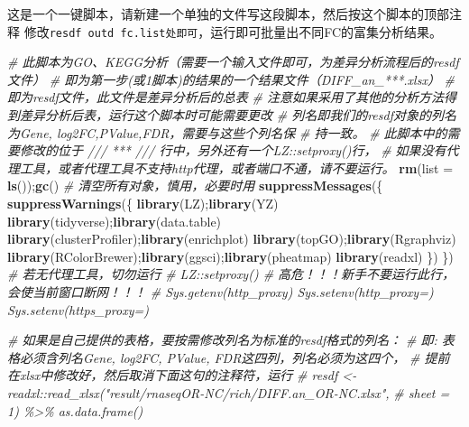 \documentclass[
]{book}
\newenvironment{Shaded}{\begin{snugshade}}{\end{snugshade}}
\newcommand{\AttributeTok}[1]{\textcolor[rgb]{0.13,0.29,0.53}{#1}}
\newcommand{\CommentTok}[1]{\textcolor[rgb]{0.56,0.35,0.01}{\textit{#1}}}
\newcommand{\FunctionTok}[1]{\textcolor[rgb]{0.13,0.29,0.53}{\textbf{#1}}}
\newcommand{\NormalTok}[1]{#1}
\begin{document}
这是一个一键脚本，请新建一个单独的文件写这段脚本，然后按这个脚本的顶部注释
修改\texttt{resdf\ outd\ fc.list处即可}，运行即可批量出不同FC的富集分析结果。

\begin{Shaded}
\begin{Highlighting}[]
\CommentTok{\# 此脚本为GO、KEGG分析（需要一个输入文件即可，为差异分析流程后的resdf文件）}
\CommentTok{\# 即为第一步(或1脚本)的结果的一个结果文件（DIFF\_an\_***.xlsx）}
\CommentTok{\# 即为resdf文件，此文件是差异分析后的总表}
\CommentTok{\# 注意如果采用了其他的分析方法得到差异分析后表，运行这个脚本时可能需要更改}
\CommentTok{\# 列名即我们的resdf对象的列名为Gene, log2FC,PValue,FDR，需要与这些个列名保}
\CommentTok{\# 持一致。}
\CommentTok{\# 此脚本中的需要修改的位于 /// *** /// 行中，另外还有一个LZ::setproxy()行，}
\CommentTok{\#   如果没有代理工具，或者代理工具不支持http代理，或者端口不通，请不要运行。}
\FunctionTok{rm}\NormalTok{(}\AttributeTok{list =} \FunctionTok{ls}\NormalTok{());}\FunctionTok{gc}\NormalTok{() }\CommentTok{\# 清空所有对象，慎用，必要时用}
\FunctionTok{suppressMessages}\NormalTok{(\{ }\FunctionTok{suppressWarnings}\NormalTok{(\{}
  \FunctionTok{library}\NormalTok{(LZ);}\FunctionTok{library}\NormalTok{(YZ)}
  \FunctionTok{library}\NormalTok{(tidyverse);}\FunctionTok{library}\NormalTok{(data.table)}
  \FunctionTok{library}\NormalTok{(clusterProfiler);}\FunctionTok{library}\NormalTok{(enrichplot)}
  \FunctionTok{library}\NormalTok{(topGO);}\FunctionTok{library}\NormalTok{(Rgraphviz)}
  \FunctionTok{library}\NormalTok{(RColorBrewer);}\FunctionTok{library}\NormalTok{(ggsci);}\FunctionTok{library}\NormalTok{(pheatmap)}
  \FunctionTok{library}\NormalTok{(readxl)}
\NormalTok{\}) \})}
\CommentTok{\# 若无代理工具，切勿运行 }
\CommentTok{\# LZ::setproxy() \# 高危！！！新手不要运行此行，会使当前窗口断网！！！}
\CommentTok{\# Sys.getenv(\textquotesingle{}http\_proxy\textquotesingle{}) Sys.setenv(\textquotesingle{}http\_proxy\textquotesingle{}=\textquotesingle{}\textquotesingle{}) Sys.setenv(\textquotesingle{}https\_proxy\textquotesingle{}=\textquotesingle{}\textquotesingle{})}

\CommentTok{\# 如果是自己提供的表格，要按需修改列名为标准的resdf格式的列名：}
\CommentTok{\# 即: 表格必须含列名Gene, log2FC, PValue, FDR这四列，列名必须为这四个，}
\CommentTok{\# 提前在xlsx中修改好，然后取消下面这句的注释符，运行}
\CommentTok{\# resdf \textless{}{-} readxl::read\_xlsx("result/rnaseqOR{-}NC/rich/DIFF.an\_OR{-}NC.xlsx",}
\CommentTok{\#                  sheet = 1) \%\textgreater{}\% as.data.frame()}


\end{Highlighting}
\end{Shaded}
\end{document}

